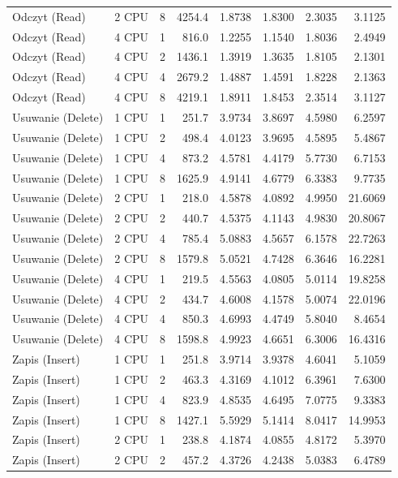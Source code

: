 \begin{table}[ht]
{\begin{tabular}{llcrrrrr}
Odczyt (Read) & 2 CPU & 8 & 4254.4 & 1.8738 & 1.8300 & 2.3035 & 3.1125 \\
Odczyt (Read) & 4 CPU & 1 & 816.0 & 1.2255 & 1.1540 & 1.8036 & 2.4949 \\
Odczyt (Read) & 4 CPU & 2 & 1436.1 & 1.3919 & 1.3635 & 1.8105 & 2.1301 \\
Odczyt (Read) & 4 CPU & 4 & 2679.2 & 1.4887 & 1.4591 & 1.8228 & 2.1363 \\
Odczyt (Read) & 4 CPU & 8 & 4219.1 & 1.8911 & 1.8453 & 2.3514 & 3.1127 \\
Usuwanie (Delete) & 1 CPU & 1 & 251.7 & 3.9734 & 3.8697 & 4.5980 & 6.2597 \\
Usuwanie (Delete) & 1 CPU & 2 & 498.4 & 4.0123 & 3.9695 & 4.5895 & 5.4867 \\
Usuwanie (Delete) & 1 CPU & 4 & 873.2 & 4.5781 & 4.4179 & 5.7730 & 6.7153 \\
Usuwanie (Delete) & 1 CPU & 8 & 1625.9 & 4.9141 & 4.6779 & 6.3383 & 9.7735 \\
Usuwanie (Delete) & 2 CPU & 1 & 218.0 & 4.5878 & 4.0892 & 4.9950 & 21.6069 \\
Usuwanie (Delete) & 2 CPU & 2 & 440.7 & 4.5375 & 4.1143 & 4.9830 & 20.8067 \\
Usuwanie (Delete) & 2 CPU & 4 & 785.4 & 5.0883 & 4.5657 & 6.1578 & 22.7263 \\
Usuwanie (Delete) & 2 CPU & 8 & 1579.8 & 5.0521 & 4.7428 & 6.3646 & 16.2281 \\
Usuwanie (Delete) & 4 CPU & 1 & 219.5 & 4.5563 & 4.0805 & 5.0114 & 19.8258 \\
Usuwanie (Delete) & 4 CPU & 2 & 434.7 & 4.6008 & 4.1578 & 5.0074 & 22.0196 \\
Usuwanie (Delete) & 4 CPU & 4 & 850.3 & 4.6993 & 4.4749 & 5.8040 & 8.4654 \\
Usuwanie (Delete) & 4 CPU & 8 & 1598.8 & 4.9923 & 4.6651 & 6.3006 & 16.4316 \\
Zapis (Insert) & 1 CPU & 1 & 251.8 & 3.9714 & 3.9378 & 4.6041 & 5.1059 \\
Zapis (Insert) & 1 CPU & 2 & 463.3 & 4.3169 & 4.1012 & 6.3961 & 7.6300 \\
Zapis (Insert) & 1 CPU & 4 & 823.9 & 4.8535 & 4.6495 & 7.0775 & 9.3383 \\
Zapis (Insert) & 1 CPU & 8 & 1427.1 & 5.5929 & 5.1414 & 8.0417 & 14.9953 \\
Zapis (Insert) & 2 CPU & 1 & 238.8 & 4.1874 & 4.0855 & 4.8172 & 5.3970 \\
Zapis (Insert) & 2 CPU & 2 & 457.2 & 4.3726 & 4.2438 & 5.0383 & 6.4789 \\

\end{tabular}}
\end{table}
